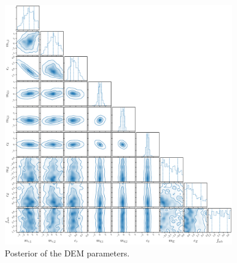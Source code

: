 \begin{figure}
\begin{center}
    \includegraphics[width=0.9\textwidth]{figs/abc.pdf}
    \caption{Posterior of the DEM parameters.}
\label{fig:dem}
\end{center}
\end{figure}

